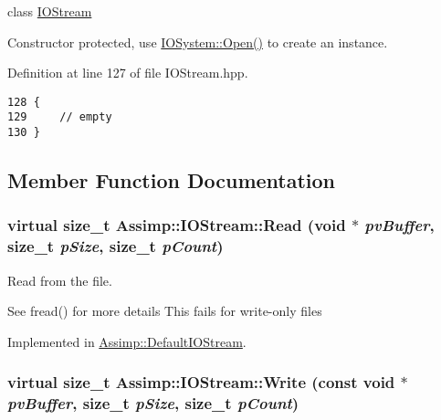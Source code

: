 class \hyperlink{class_assimp_1_1_i_o_stream}{IOStream} 

Constructor protected, use \hyperlink{class_assimp_1_1_i_o_system_c512ece3b0701de5682553007a4c0816}{IOSystem::Open()} to create an instance. 

Definition at line 127 of file IOStream.hpp.

\begin{Code}\begin{verbatim}128 {
129     // empty
130 }
\end{verbatim}
\end{Code}




\subsection{Member Function Documentation}
\hypertarget{class_assimp_1_1_i_o_stream_e376f641020989d61863b9c6f55c7abf}{
\subsubsection[Read]{\setlength{\rightskip}{0pt plus 5cm}virtual size\_\-t Assimp::IOStream::Read (void $\ast$ {\em pvBuffer}, \/  size\_\-t {\em pSize}, \/  size\_\-t {\em pCount})}}
\label{class_assimp_1_1_i_o_stream_e376f641020989d61863b9c6f55c7abf}


Read from the file. 

See fread() for more details This fails for write-only files 

Implemented in \hyperlink{class_assimp_1_1_default_i_o_stream_a45b659531f179122c7e7852ad6f5f14}{Assimp::DefaultIOStream}.\hypertarget{class_assimp_1_1_i_o_stream_d0ca4aae1b8c4d00db391ac3a4171f7b}{
\subsubsection[Write]{\setlength{\rightskip}{0pt plus 5cm}virtual size\_\-t Assimp::IOStream::Write (const void $\ast$ {\em pvBuffer}, \/  size\_\-t {\em pSize}, \/  size\_\-t {\em pCount})}}
\label{class_assimp_1_1_i_o_stream_d0ca4aae1b8c4d00db391ac3a4171f7b}


